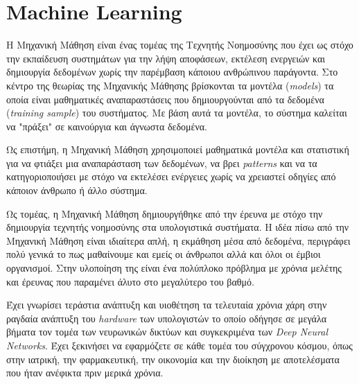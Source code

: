 \thispagestyle{empty}

\chapter{Machine Learning}

Η Μηχανική Μάθηση είναι ένας τομέας της Τεχνητής Νοημοσύνης που έχει ως στόχο την εκπαίδευση συστημάτων για την λήψη αποφάσεων, εκτέλεση ενεργειών και δημιουργία δεδομένων χωρίς την παρέμβαση κάποιου ανθρώπινου παράγοντα. Στο κέντρο της θεωρίας της Μηχανικής Μάθησης βρίσκονται τα μοντέλα (\textit{models}) τα οποία είναι μαθηματικές αναπαραστάσεις που δημιουργούνται από τα δεδομένα (\textit{training sample}) του συστήματος. Με βάση αυτά τα μοντέλα, το σύστημα καλείται να "πράξει" σε καινούργια και άγνωστα δεδομένα.
\par
Ως επιστήμη, η Μηχανική Μάθηση χρησιμοποιεί μαθηματικά μοντέλα και στατιστική για να φτιάξει μια αναπαράσταση των δεδομένων, να βρει \textit{patterns} και να τα κατηγοριοποιήσει με στόχο να εκτελέσει ενέργειες χωρίς να χρειαστεί οδηγίες από κάποιον άνθρωπο ή άλλο σύστημα.
\par
Ως τομέας, η Μηχανική Μάθηση δημιουργήθηκε από την έρευνα με στόχο την δημιουργία τεχνητής νοημοσύνης στα υπολογιστικά συστήματα. Η ιδέα πίσω από την Μηχανική Μάθηση είναι ιδιαίτερα απλή, η εκμάθηση μέσα από δεδομένα, περιγράφει πολύ γενικά το πως μαθαίνουμε και εμείς οι άνθρωποι αλλά και όλοι οι έμβιοι οργανισμοί. Στην υλοποίηση της είναι ένα πολύπλοκο πρόβλημα με χρόνια μελέτης και έρευνας που παραμένει άλυτο στο μεγαλύτερο του βαθμό.
\par
Έχει γνωρίσει τεράστια ανάπτυξη και υιοθέτηση τα τελευταία χρόνια χάρη στην ραγδαία ανάπτυξη του \textit{hardware} των υπολογιστών το οποίο οδήγησε σε μεγάλα βήματα τον τομέα των νευρωνικών δικτύων και συγκεκριμένα των \textit{Deep Neural Networks}. Έχει ξεκινήσει να εφαρμόζετε σε κάθε τομέα του σύγχρονου κόσμου, όπως στην ιατρική, την φαρμακευτική, την οικονομία και την διοίκηση με αποτελέσματα που ήταν ανέφικτα πριν μερικά χρόνια. \cite{mlintro}


